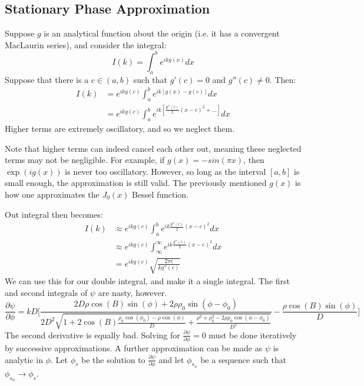 \documentclass[crop=false,class=book,oneside]{standalone}
\begin{document}
        \subsection{Stationary Phase Approximation}
            Suppose $g$ is an analytical function about the origin (i.e. it has a convergent MacLaurin series), and consider the integral:
                \begin{equation}
                    I(k) = \int_{a}^{b}e^{ikg(x)}dx
                \end{equation}
                Suppose that there is a $c\in(a,b)$ such that $g'(c)=0$ and $g''(c)\ne 0$. Then:
                \begin{align}
                    \nonumber I(k)&=e^{ikg(c)}\int_{a}^{b}e^{ik[g(x)-g(c)]}dx\\
                    &=e^{ikg(c)}\int_{a}^{b}e^{ik[\frac{g''(c)}{2}(x-c)^{2}+\hdots]}dx
                \end{align}
                Higher terms are extremely oscillatory, and so we neglect them.
                \begin{remark}
                Note that higher terms can indeed cancel each other out, meaning these neglected terms may not be negligible. For example, if $g(x)=-sin(\pi x)$, then $\exp(ig(x))$ is never too oscillatory. However, so long as the interval $[a,b]$ is small enough, the approximation is still valid. The previously mentioned $g(x)$ is how one approximates the $J_{0}(x)$ Bessel function.
                \end{remark}
                Out integral then becomes:
                \begin{align}
                    I(k)&\approx e^{ikg(c)}\int_{a}^{b}e^{ik\frac{g''(c)}{2}(x-c)^{2}}dx\\
                    &\approx e^{ikg(c)}\int_{\infty}^{\infty}e^{ik\frac{g''(c)}{2}(x-c)^{2}}dx\\
                    &=e^{ikg(c)}\sqrt{\frac{2\pi i}{kg''(c)}}
                \end{align}
                We can use this for our double integral, and make it a single integral. The first and second integrals of $\psi$ are nasty, however.
                \begin{equation}
                    \frac{\partial \psi}{\partial \phi}=kD\Big[\frac{2D\rho\cos(B)\sin(\phi)+2\rho\rho_{0}\sin(\phi-\phi_{0})}{2D^2\sqrt{1+2\cos(B)\frac{\rho_{0}\cos(\phi_{0})-\rho\cos(\phi)}{D}+\frac{\rho^{2}+\rho_{0}^{2}-2\rho\rho_{0}\cos(\phi-\phi_{0})}{D^2}}}-\frac{\rho\cos(B)\sin(\phi)}{D}\Big]
                \end{equation}
                The second derivative is equally bad. Solving for $\frac{\partial \psi}{\partial \phi}=0$ must be done iteratively by successive approximations. A further approximation can be made as $\psi$ is analytic in $\phi$. Let $\phi_{s}$ be the solution to $\frac{\partial\psi}{\partial\phi}$ and let $\phi_{s_{n}}$ be a sequence such that $\phi_{s_{n}}\rightarrow \phi_{s}$.
\end{document}
